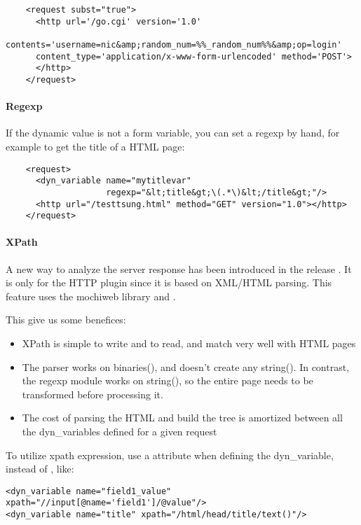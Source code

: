 \documentclass{TSUNG-en}
\begin{document}
\begin{Verbatim}
    <request subst="true">
      <http url='/go.cgi' version='1.0'
      contents='username=nic&amp;random_num=%%_random_num%%&amp;op=login'
      content_type='application/x-www-form-urlencoded' method='POST'>
      </http>
    </request>
\end{Verbatim}

\paragraph{Regexp}

If the dynamic value is not a form variable, you can set a regexp by
hand, for example to get the title of a HTML page:
\begin{Verbatim}
    <request>
      <dyn_variable name="mytitlevar"
                    regexp="&lt;title&gt;\(.*\)&lt;/title&gt;"/>
      <http url="/testtsung.html" method="GET" version="1.0"></http>
    </request>
\end{Verbatim}

\paragraph{XPath}

A new way to analyze the server response has been introduced in the
release . It is only for the HTTP plugin since it is
based on XML/HTML parsing. This feature uses the mochiweb library
and .

This give us some benefices:

\begin{itemize}
\item XPath is simple to write and to read, and match very well with
  HTML pages
\item The parser works on binaries(), and doesn't create any
  string(). In contrast, the regexp module works on string(), so the
  entire page needs to be  transformed before
  processing it.
\item The cost of parsing the HTML and build the tree is amortized
  between all the dyn\_variables defined for a given request
\end{itemize}

To utilize xpath expression, use a  attribute when
defining the dyn\_variable, instead of , like:
\begin{Verbatim}
<dyn_variable name="field1_value" xpath="//input[@name='field1']/@value"/>
<dyn_variable name="title" xpath="/html/head/title/text()"/>
\end{Verbatim}
\end{document}
